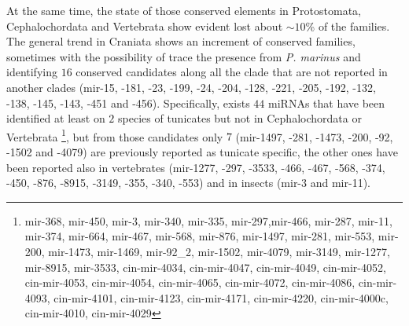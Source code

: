 \documentclass[11pt]{article}
\begin{document}
At the same time, the state of those conserved elements in Protostomata, 
Cephalochordata and Vertebrata show evident lost about $\sim 10$\% of the 
families.
The general trend in Craniata shows an increment of conserved 
families, sometimes with the possibility of trace the presence from \textit{P. 
marinus} and identifying $16$ conserved candidates along all the clade 
that are not reported in another clades (mir-15, -181, -23, -199, 
-24, -204, -128, -221, -205, -192, -132, -138, -145, -143, -451 and 
-456). Specifically, exists $44$ miRNAs that have been identified at least 
on $2$ species of tunicates but not in Cephalochordata or 
Vertebrata \footnote{mir-368, mir-450, mir-3, mir-340, mir-335, 
mir-297,mir-466, mir-287, mir-11, mir-374, mir-664, mir-467, mir-568, mir-876, 
mir-1497, mir-281, mir-553, mir-200, mir-1473, mir-1469, mir-92\_2, mir-1502, 
mir-4079, mir-3149, mir-1277, mir-8915, mir-3533, cin-mir-4034, cin-mir-4047, 
cin-mir-4049, cin-mir-4052, cin-mir-4053, cin-mir-4054, 
cin-mir-4065, cin-mir-4072, cin-mir-4086, cin-mir-4093, 
cin-mir-4101, cin-mir-4123, cin-mir-4171, cin-mir-4220, 
cin-mir-4000c, cin-mir-4010, cin-mir-4029}, but from those candidates only $7$ 
(mir-1497, -281, -1473, -200, -92, -1502 and -4079) are previously reported as 
tunicate specific, the other ones have been reported also in vertebrates 
(mir-1277, -297, -3533, -466, -467, -568, -374, -450, -876, -8915, -3149, -355, 
-340, -553) and in insects (mir-3 and mir-11). 
\end{document}
